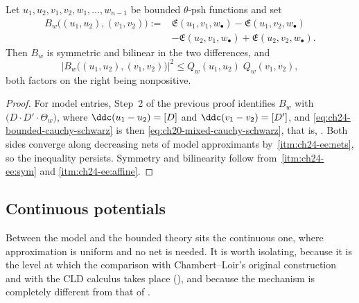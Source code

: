 \begin{corollary}
\label{cor:ch24-bounded-cauchy-schwarz}
Let \(u_1,u_2,v_1,v_2,w_1,\ldots,w_{n-1}\) be bounded \(\theta\)-psh
functions and set
\[
 \begin{aligned}
 B_w\bigl((u_1,u_2),(v_1,v_2)\bigr)
 :={}&\mathfrak E(u_1,v_1,w_\bullet)-\mathfrak E(u_1,v_2,w_\bullet)\\
 &-\mathfrak E(u_2,v_1,w_\bullet)+\mathfrak E(u_2,v_2,w_\bullet).
 \end{aligned}
\]
Then \(B_w\) is symmetric and bilinear in the two differences, and
\begin{equation}
\label{eq:ch24-bounded-cauchy-schwarz}
 \bigl|B_w\bigl((u_1,u_2),(v_1,v_2)\bigr)\bigr|^2
 \leq Q_w(u_1,u_2)\;Q_w(v_1,v_2),
\end{equation}
both factors on the right being nonpositive.
\end{corollary}

\begin{proof}
For model entries, Step~2 of the previous proof identifies
\(B_w\) with \(\bigl(D\cdot D'\cdot\Theta_w\bigr)\), where
\(\ddc(u_1-u_2)=[D]\) and \(\ddc(v_1-v_2)=[D']\), and
\eqref{eq:ch24-bounded-cauchy-schwarz} is then
\eqref{eq:ch20-mixed-cauchy-schwarz}, that is,
.  Both sides converge along decreasing
nets of model approximants by
\,\cref{itm:ch24-ee:nets}, so the inequality
persists.  Symmetry and bilinearity follow from
\,\cref{itm:ch24-ee:sym} and
\cref{itm:ch24-ee:affine}.
\end{proof}

\subsection{Continuous potentials}
\label{sec:ch24-continuous}

Between the model and the bounded theory sits the continuous one, where
approximation is uniform and no net is needed.  It is worth isolating,
because it is the level at which the comparison with Chambert--Loir's
original construction and with the CLD calculus takes place
(), and because the mechanism is completely
different from that of .

